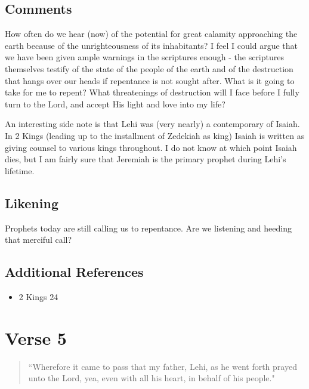 \documentclass[12pt]{report}
\begin{document}
\subsection{Comments\label{1Nephi1:4:comments}}
How often do we hear (now) of the potential for great calamity approaching the earth because of the unrighteousness of its inhabitants?  I feel I could argue that we have been given ample warnings in the scriptures enough - the scriptures themselves testify of the state of the people of the earth and of the destruction that hangs over our heads if repentance is not sought after.  What is it going to take for me to repent?  What threatenings of destruction will I face before I fully turn to the Lord, and accept His light and love into my life?

An interesting side note is that Lehi was (very nearly) a contemporary of Isaiah.  In 2 Kings (leading up to the installment of Zedekiah as king) Isaiah is written as giving counsel to various kings throughout.  I do not know at which point Isaiah dies, but I am fairly sure that Jeremiah is the primary prophet during Lehi's lifetime.

\subsection{Likening\label{1Nephi1:4:likening}}
Prophets today are still calling us to repentance.  Are we listening and heeding that merciful call?

\subsection{Additional References\label{1Nephi1:4:references}}
\begin{itemize}
\item 2 Kings 24
\end{itemize}

\section{Verse 5\label{1Nephi1:5}}
\begin{center}
\begin{quote}
``Wherefore it came to pass that my father, Lehi, as he went forth prayed unto the Lord, yea, even with all his heart, in behalf of his people."
\end{quote}
\end{center}
\end{document}
